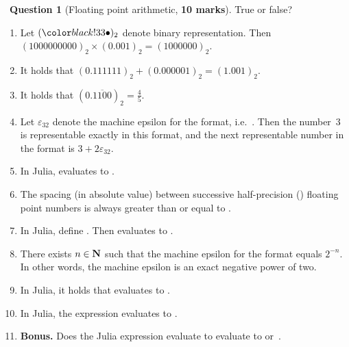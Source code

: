\documentclass[10pt]{article}
\theoremstyle{definition}
\newtheorem{question}{{\normalfont \faGears}~Question}
\renewcommand{\mymarks}[1]{\textbf{#1 marks}}
\begin{document}
\newpage
\begin{question}
    [Floating point arithmetic, \mymarks{10}]
    True or false?
    \begin{enumerate}
        \item Let $(\placeholder)_2$ denote binary representation.
            Then
            \(
                (1000000000)_2 \times (0.001)_2 = (1000000)_2.
            \)

        \item It holds that
            \(
                (0.111111)_2 + (0.000001)_2 = (1.001)_2.
            \)

        \item
            It holds that $(0.\overline{1100})_2 = \frac{4}{5}$.

        \item
            Let $\varepsilon_{32}$ denote the machine epsilon for the  format,
            i.e.\ .
            Then the number~3 is representable exactly in this format,
            and the next representable number in the  format is $3 + 2\varepsilon_{32}$.

        \item
            In Julia,  evaluates to .

        \item
            The spacing (in absolute value) between successive half-precision () floating point numbers is always greater than or equal to .

        \item
            In Julia, define .
            Then  evaluates to .

        \item
            There exists $n \in \mathbf N$ such that the machine epsilon for the  format equals $2^{-n}$.
            In other words, the machine epsilon is an exact negative power of two.

        \item
            In Julia, it holds that  evaluates to .

        \item
            In Julia, the expression  evaluates to .

        \item
            \textbf{Bonus.}
            Does the Julia expression evaluate to  evaluate to  or~.


\end{enumerate}
\end{question}
\end{document}
